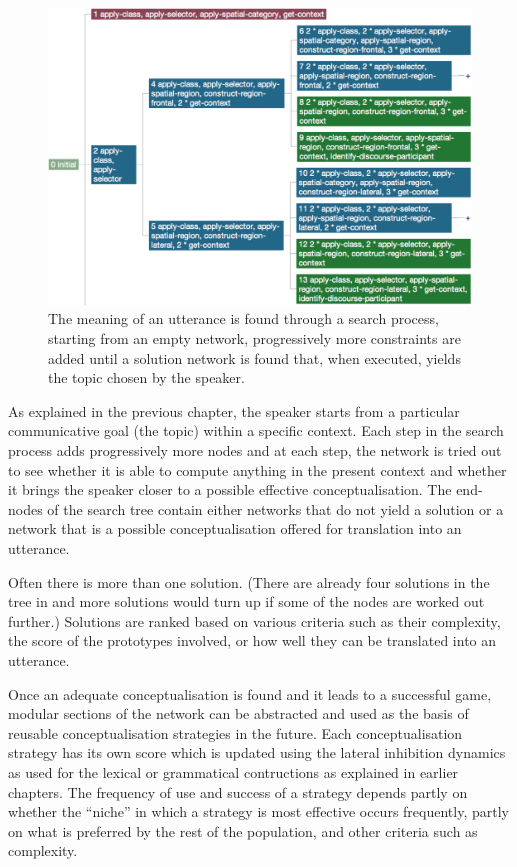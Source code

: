 \begin{figure}
\begin{centering}
\includegraphics[width=1\columnwidth]{chap12/figs/conceptualization.pdf}
\end{centering}
\caption{The meaning of an utterance is found through a search process, starting from an empty network, progressively more 
constraints are added until a solution network is found that, when executed, yields the topic chosen by the speaker.}
\label{fig:tree}
\end{figure}
\enlargethispage{1\baselineskip}
As explained in the previous chapter, the speaker starts from a particular communicative goal (the topic) within a 
specific context. Each step in the search process adds progressively more nodes and at each step, the network is tried out to 
see whether it is able to compute anything in the present context and whether it brings the 
speaker closer to a possible effective conceptualisation. The end-nodes of the search tree contain either networks that 
do not yield a solution or a network that is a possible conceptualisation offered for translation into an utterance. 

Often there is more than one solution. (There are already four solutions in the tree in  and more solutions 
would turn up if some of the nodes are worked out further.) Solutions are ranked based on various criteria such as their 
complexity, the score of the prototypes involved, or how well they can be translated into an utterance.

Once an adequate conceptualisation is found and it leads to a successful game, modular sections of the network can be 
abstracted and used as the basis of reusable conceptualisation strategies in the future. Each conceptualisation 
strategy has its own score which is updated using the lateral inhibition dynamics as used for 
the lexical or grammatical contructions as explained in earlier chapters. The frequency of use and success 
of a strategy depends partly on whether the ``niche'' in which a strategy is most effective occurs frequently, partly 
on what is preferred by the rest of the population, and other criteria such as complexity.


